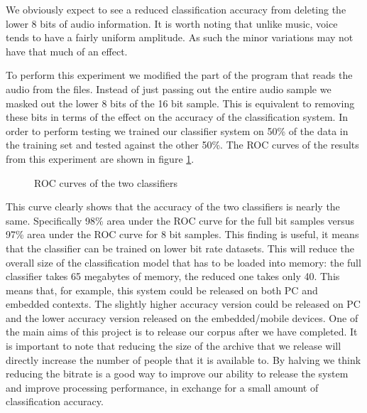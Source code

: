 \documentclass[ %
                    author={Sam Phippen},
                supervisor={Dr. Rafal Bogacz},
                     title={Real time voice activity detectors in noisy personal computing environments},
                  subtitle={},
                    degree={MEng},
                      year={2012} ]{thesis}
\begin{document}
We obviously expect to see a reduced classification accuracy from deleting
the lower 8 bits of audio information. It is worth noting that unlike music,
voice tends to have a fairly uniform amplitude. As such the minor variations
may not have that much of an effect.

To perform this experiment we modified the part of the program that reads the
audio from the files. Instead of just passing out the entire audio sample we
masked out the lower 8 bits of the 16 bit sample. This is equivalent to
removing these bits in terms of the effect on the accuracy of the
classification system. In order to perform testing we trained our classifier
system on 50\% of the data in the training set and tested against the other
50\%. The ROC curves of the results from this experiment are shown in
figure \ref{fig:roc-bitcrush}.

\begin{figure}
    \caption{ROC curves of the two classifiers}
    \label{fig:roc-bitcrush}
\end{figure}

This curve clearly shows that the accuracy of the two classifiers is nearly the
same. Specifically 98\% area under the ROC curve for the full bit samples
versus 97\% area under the ROC curve for 8 bit samples. This finding is useful,
it means that the classifier can be trained on lower bit rate datasets. This
will reduce the overall size of the classification model that has to be loaded
into memory: the full classifier takes 65 megabytes of memory, the reduced one
takes only 40.  This means that, for example, this system could be released on
both PC and embedded contexts. The slightly higher accuracy version could be
released on PC and the lower accuracy version released on the embedded/mobile
devices. One of the main aims of this project is to release our corpus after we
have completed.  It is important to note that reducing the size of the archive
that we release will directly increase the number of people that it is
available to. By halving we think reducing the bitrate is a good way to improve
our ability to release the system and improve processing performance, in exchange
for a small amount of classification accuracy.
\end{document}
